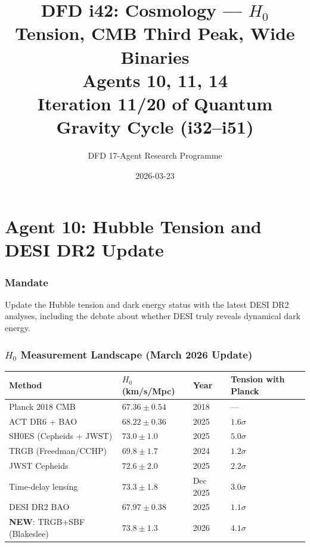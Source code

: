 \documentclass[11pt,a4paper]{article}
\title{DFD i42: Cosmology --- $H_0$ Tension, CMB Third Peak, Wide Binaries\\[6pt]
\large Agents 10, 11, 14\\[6pt]
\normalsize Iteration 11/20 of Quantum Gravity Cycle (i32--i51)}
\author{DFD 17-Agent Research Programme}
\date{2026-03-23}
\newcommand{\NEW}{\textcolor{dfdblue}{\textbf{NEW}}}
\begin{document}
\maketitle
\tableofcontents
\newpage

\part{Agent 10: Hubble Tension and DESI DR2 Update}
\label{part:agent10}

\section{Mandate}

Update the Hubble tension and dark energy status with the latest DESI DR2 analyses, including the debate about whether DESI truly reveals dynamical dark energy.

\section{$H_0$ Measurement Landscape (March 2026 Update)}

\begin{center}
\begin{longtable}{p{4cm}lll}
\toprule
\textbf{Method} & \textbf{$H_0$ (km/s/Mpc)} & \textbf{Year} & \textbf{Tension with Planck} \\
\midrule
\endhead
Planck 2018 CMB & $67.36 \pm 0.54$ & 2018 & --- \\
\midrule
ACT DR6 + BAO & $68.22 \pm 0.36$ & 2025 & $1.6\sigma$ \\
\midrule
SH0ES (Cepheids + JWST) & $73.0 \pm 1.0$ & 2025 & $5.0\sigma$ \\
\midrule
TRGB (Freedman/CCHP) & $69.8 \pm 1.7$ & 2024 & $1.2\sigma$ \\
\midrule
JWST Cepheids & $72.6 \pm 2.0$ & 2025 & $2.2\sigma$ \\
\midrule
Time-delay lensing & $73.3 \pm 1.8$ & Dec 2025 & $3.0\sigma$ \\
\midrule
DESI DR2 BAO & $67.97 \pm 0.38$ & 2025 & $1.1\sigma$ \\
\midrule
\NEW: TRGB+SBF (Blakeslee) & $73.8 \pm 1.3$ & 2026 & $4.1\sigma$ \\
\bottomrule
\end{longtable}
\end{center}
\end{document}
